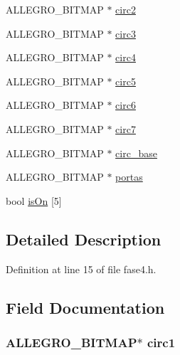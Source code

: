 \begin{DoxyCompactItemize}
\item 
A\-L\-L\-E\-G\-R\-O\-\_\-\-B\-I\-T\-M\-A\-P $\ast$ \hyperlink{struct_level_quatro_a1b8836cb8a00a286c87bfbafdacbd03d}{circ2}
\item 
A\-L\-L\-E\-G\-R\-O\-\_\-\-B\-I\-T\-M\-A\-P $\ast$ \hyperlink{struct_level_quatro_aaa21201ceebf455212233414bd6eedbc}{circ3}
\item 
A\-L\-L\-E\-G\-R\-O\-\_\-\-B\-I\-T\-M\-A\-P $\ast$ \hyperlink{struct_level_quatro_a1adf43c25b4c9b87aeb45c1e4bd24d4f}{circ4}
\item 
A\-L\-L\-E\-G\-R\-O\-\_\-\-B\-I\-T\-M\-A\-P $\ast$ \hyperlink{struct_level_quatro_a6444f15bb917b382f7e91576f46c2706}{circ5}
\item 
A\-L\-L\-E\-G\-R\-O\-\_\-\-B\-I\-T\-M\-A\-P $\ast$ \hyperlink{struct_level_quatro_a727b47ddfdf73dd07d1a2832fc0f24f9}{circ6}
\item 
A\-L\-L\-E\-G\-R\-O\-\_\-\-B\-I\-T\-M\-A\-P $\ast$ \hyperlink{struct_level_quatro_a4c8ba6392592a4e079c99008ad6e1e30}{circ7}
\item 
A\-L\-L\-E\-G\-R\-O\-\_\-\-B\-I\-T\-M\-A\-P $\ast$ \hyperlink{struct_level_quatro_aee8957702842b3d636f0a1075b6e52e2}{circ\-\_\-base}
\item 
A\-L\-L\-E\-G\-R\-O\-\_\-\-B\-I\-T\-M\-A\-P $\ast$ \hyperlink{struct_level_quatro_a6c47128335a6e9846fb9576bace5a597}{portas}
\item 
bool \hyperlink{struct_level_quatro_a59f6fe985ed5513f62660b2926c812aa}{is\-On} \mbox{[}5\mbox{]}
\end{DoxyCompactItemize}


\subsection{Detailed Description}


Definition at line 15 of file fase4.\-h.



\subsection{Field Documentation}
\hypertarget{struct_level_quatro_a9877f31790b6d2f38fb468a9448223f1}{
\subsubsection[{circ1}]{\setlength{\rightskip}{0pt plus 5cm}A\-L\-L\-E\-G\-R\-O\-\_\-\-B\-I\-T\-M\-A\-P$\ast$ circ1}}\label{struct_level_quatro_a9877f31790b6d2f38fb468a9448223f1}


